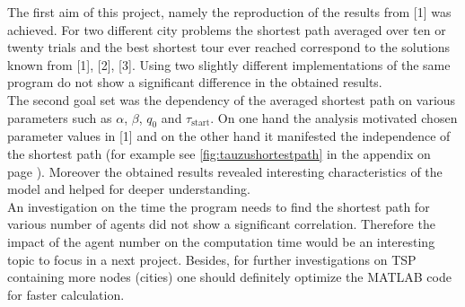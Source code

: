 The first aim of this project, namely the reproduction of the results from [1] was achieved. For two different city problems the shortest path averaged over ten or twenty trials and the best shortest tour ever reached correspond to the solutions known from [1], [2], [3]. Using two slightly different implementations of the same program do not show a significant difference in the obtained results.\\The second goal set was the dependency of the averaged shortest path on various parameters such as $\alpha$, $\beta$, $q_0$ and $\tau_\text{start}$. On one hand the analysis motivated chosen parameter values in [1] and on the other hand it manifested the independence of the shortest path (for example see \ref{fig:tauzushortestpath} in the appendix on page \pageref{fig:tauzushortestpath}). Moreover the obtained results revealed interesting characteristics of the model and helped for deeper understanding.\\
An investigation on the time the program needs to find the shortest path for various number of agents did not show a significant correlation. Therefore the impact of the agent number on the computation time would be an interesting topic to focus in a next project. Besides, for further investigations on TSP containing more nodes (cities) one should definitely optimize the MATLAB code for faster calculation.